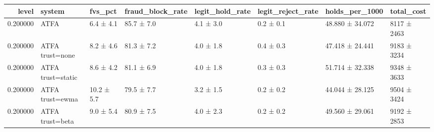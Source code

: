 \begin{tabular}{rlllllll}
\toprule
level & system & fvs\_pct & fraud\_block\_rate & legit\_hold\_rate & legit\_reject\_rate & holds\_per\_1000 & total\_cost \\
\midrule
0.200000 & ATFA & 6.4 ± 4.1 & 85.7 ± 7.0 & 4.1 ± 3.0 & 0.2 ± 0.1 & 48.880 ± 34.072 & 8117 ± 2463 \\
0.200000 & ATFA trust=none & 8.2 ± 4.6 & 81.3 ± 7.2 & 4.0 ± 1.8 & 0.4 ± 0.3 & 47.418 ± 24.441 & 9183 ± 3234 \\
0.200000 & ATFA trust=static & 8.6 ± 4.2 & 81.1 ± 6.9 & 4.0 ± 1.8 & 0.3 ± 0.3 & 51.714 ± 32.338 & 9348 ± 3633 \\
0.200000 & ATFA trust=ewma & 10.2 ± 5.7 & 79.5 ± 7.7 & 3.2 ± 1.5 & 0.2 ± 0.2 & 44.044 ± 28.125 & 9504 ± 3424 \\
0.200000 & ATFA trust=beta & 9.0 ± 5.4 & 80.9 ± 7.5 & 4.0 ± 2.3 & 0.2 ± 0.2 & 49.560 ± 29.061 & 9192 ± 2853 \\
\bottomrule
\end{tabular}
